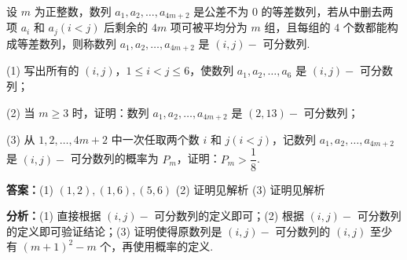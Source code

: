 \begin{question}[points=17]
设 $m$ 为正整数，数列 $a_1,a_2,\ldots,a_{4m+2}$ 是公差不为 $0$ 的等差数列，若从中删去两项 $a_i$ 和 $a_j(i<j)$ 后剩余的 $4m$ 项可被平均分为 $m$ 组，且每组的 $4$ 个数都能构成等差数列，则称数列 $a_1,a_2,\ldots,a_{4m+2}$ 是 $(i,j)-$ 可分数列.

(1) 写出所有的 $(i,j)$，$1\le i<j\le 6$，使数列 $a_1,a_2,\ldots,a_6$ 是 $(i,j)-$ 可分数列；

(2) 当 $m\ge 3$ 时，证明：数列 $a_1,a_2,\ldots,a_{4m+2}$ 是 $(2,13)-$ 可分数列；

(3) 从 $1,2,\ldots,4m+2$ 中一次任取两个数 $i$ 和 $j(i<j)$，记数列 $a_1,a_2,\ldots,a_{4m+2}$ 是 $(i,j)-$ 可分数列的概率为 $P_m$，证明：$P_m>\dfrac{1}{8}$.
\begin{solution}
\textbf{答案：}(1) $(1,2),(1,6),(5,6)$ (2) 证明见解析 (3) 证明见解析

\textbf{分析：}(1) 直接根据 $(i,j)-$ 可分数列的定义即可；(2) 根据 $(i,j)-$ 可分数列的定义即可验证结论；(3) 证明使得原数列是 $(i,j)-$ 可分数列的 $(i,j)$ 至少有 $(m+1)^2-m$ 个，再使用概率的定义.


\end{solution}
\end{question}

